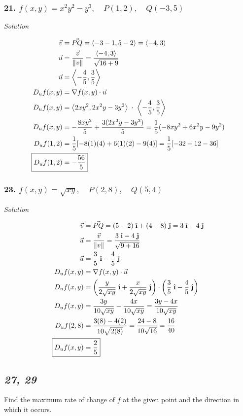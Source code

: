 \documentclass{article}
\newcommand{\ihat}{\;\hat{\textbf{\i}}}
\newcommand{\jhat}{\;\hat{\textbf{\j}}}
\newcommand\vv[1]{\left\langle #1 \right\rangle}
\newcommand\mgv[1]{\|#1\|}
\newcommand{\solution}{\centerline{\textit{Solution}}}
\newcommand{\bp}[1]{\left(#1\right)}
\begin{document}
\subsubsection*{21. $f(x,y) = x^2y^2-y^3,\quad P(1,2), \quad Q(-3,5)$}
\solution
\begin{align*}
    \vec v &= \vec {PQ} = \vv{-3-1, 5-2} = \vv{-4, 3} \\
    \vec u &= \frac {\vec v}{\mgv{v}} = \displaystyle\frac{\vv{-4,
    3}}{\sqrt{16+9}} \\
    \vec u &= \vv{-\frac 4 5, \frac 3 5} \\
    D_u f(x,y) &= \nabla f(x,y) \cdot \vec u \\
    D_u f(x,y) &= \vv{2xy^2, 2x^2y-3y^2}\;\cdot\;\vv{-\frac 4 5, \frac 3 5} \\
    D_u f(x,y) &= -\displaystyle\frac{8xy^2}{5} +
    \displaystyle\frac{3(2x^2y-3y^2)}{5} = \frac 1 5(-8xy^2+6x^2y-9y^2) \\
    D_u f(1,2) &= \frac 1 5[-8(1)(4) + 6(1)(2)-9(4)] = \frac 1 5[-32 + 12 - 36] \\
    \Aboxed{D_u f(1,2) &= -\frac{56}{5}}
\end{align*}
\subsubsection*{23. $f(x,y) = \sqrt{xy},\quad P(2,8),\quad Q(5,4)$}
\solution
\begin{align*}
    \vec v &= \vec {PQ} = (5-2)\ihat + (4-8)\jhat = 3\ihat - 4\jhat \\
    \vec u &= \frac {\vec v}{\mgv{v}} = \displaystyle\frac{3\ihat -
    4\jhat}{\sqrt{9 + 16}} \\
    \vec u &= \frac 3 5\ihat - \frac 4 5\jhat \\
    D_u f(x,y) &= \nabla f(x,y) \cdot \vec u \\
    D_u f(x,y) &= 
    \bp{\displaystyle\frac{y}{2\sqrt{xy}}\ihat+\displaystyle\frac{x}{2\sqrt{xy}}\jhat}
    \cdot \bp{\frac 3 5\ihat - \frac 4 5\jhat} \\
    D_u f(x,y) &= \displaystyle\frac{3y}{10\sqrt{xy}} -
    \displaystyle\frac{4x}{10\sqrt{xy}} = \displaystyle\frac{3y-4x}{10\sqrt{xy}}
    \\
    D_u f(2,8) &= \frac{3(8)-4(2)}{10\sqrt{2(8)}} = \frac{24-8}{10\sqrt{16}} =
    \frac {16}{40} \\
    \Aboxed{D_u f(x,y) &= \frac 2 5}
\end{align*}
\newpage 
\begin{center}
    \subsection*{\textit{27, 29}} 
    Find the maximum rate of change of $f$ at the given point and the direction
    in which it occurs.
\end{center}
\end{document}
